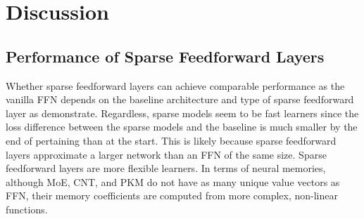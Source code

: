 \section{Discussion}
\label{sec:discussion}
\subsection{Performance of Sparse Feedforward Layers}
Whether sparse feedforward layers can achieve comparable performance as the vanilla FFN depends on the baseline architecture and type of sparse feedforward layer as  demonstrate. Regardless, sparse models seem to be fast learners since the loss difference between the sparse models and the baseline is much smaller by the end of pertaining than at the start. This is likely because sparse feedforward layers approximate a larger network than an FFN of the same size. Sparse feedforward layers are more flexible learners. In terms of neural memories, although MoE, CNT, and PKM do not have as many unique value vectors as FFN, their memory coefficients are computed from more complex, non-linear functions.



